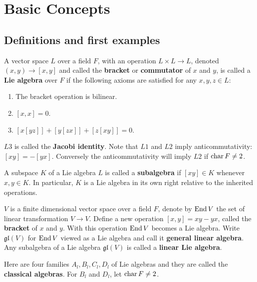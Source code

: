 \chapter{Basic Concepts}
\section{Definitions and first examples}


\begin{definition}
    A vector space $L$ over a field $F$, with an operation $L \times L \to L$, denoted $(x,y)\to [x,y]$ and called the \textbf{bracket} or \textbf{commutator} of $x$ and $y$, is called a \textbf{Lie algebra} over $F$ if the following axioms are satisfied for any $x,y,z \in L$:
    \begin{enumerate}[label=L\arabic*]
        \item The bracket operation is bilinear.
        \item $[x,x]=0$.
        \item $[x[yz]]+[y[zx]]+[z[xy]]=0$.
    \end{enumerate}
\end{definition}
\begin{remark}
    $L3$ is called the \textbf{Jacobi identity}. Note that $L1$ and $L2$ imply anticommutativity: $[xy]=-[yx]$. Conversely the anticommutativity will imply $L2$ if $\operatorname{char} F \neq 2$.
\end{remark}

\begin{definition}
    A subspace $K$ of a Lie algebra $L$ is called a \textbf{subalgebra} if $[xy] \in K$ whenever $x,y \in K$. In particular, $K$ is a Lie algebra in its own right relative to the inherited operations. 
\end{definition}

\begin{definition}
    $V$ is a finite dimensional vector space over a field $F$, denote by $\operatorname{End} V$ the set of linear transformation $V\to V$. Define a new operation $[x,y]=xy-yx$, called the \textbf{bracket} of $x$ and $y$. With this operation $\operatorname{End} V$ becomes a Lie algebra. Write $\mathfrak{gl}(V)$ for $\operatorname{End} V$ viewed as a Lie algebra and call it \textbf{general linear algebra}. Any subalgebra of a Lie algebra $\mathfrak{gl}(V)$ is called a \textbf{linear Lie algebra}.
\end{definition}

Here are four families $A_l, B_l, C_l, D_l$ of Lie algebras and they are called the \textbf{classical algebras}. For $B_l$ and $D_l$, let $\operatorname{char} F \neq 2$.


